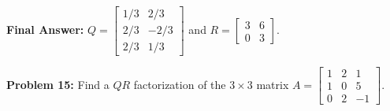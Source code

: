 \documentclass[11pt, letterpaper]{article}
\theoremstyle{definition}
\theoremstyle{remark}
\begin{document}
\textbf{Final Answer:} $Q = \begin{bmatrix} 1/3 & 2/3 \\ 2/3 & -2/3 \\ 2/3 & 1/3 \end{bmatrix}$ and $R = \begin{bmatrix} 3 & 6 \\ 0 & 3 \end{bmatrix}$.

\vspace{0.8em}

\textbf{Problem 15:} Find a $QR$ factorization of the $3 \times 3$ matrix $A = \begin{bmatrix} 1 & 2 & 1 \\ 1 & 0 & 5 \\ 0 & 2 & -1 \end{bmatrix}$.
\end{document}
